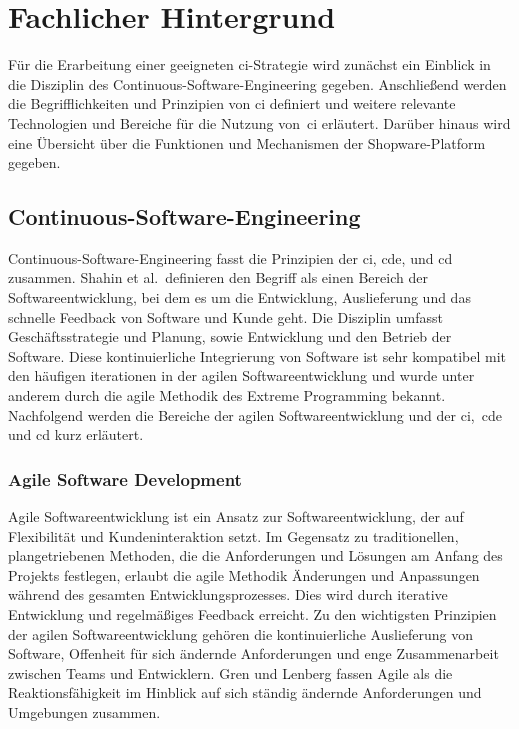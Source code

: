 
\section{Fachlicher Hintergrund} \label{sec:02-background}

Für die Erarbeitung einer geeigneten \acrshort{ci}-Strategie wird zunächst ein Einblick in die Disziplin des
Continuous-Software-Engineering gegeben.
Anschließend werden die Begrifflichkeiten und Prinzipien von \acrlong{ci} definiert und weitere
relevante Technologien und Bereiche für die Nutzung von\ \acrshort{ci} erläutert.
Darüber hinaus wird eine Übersicht über die Funktionen und Mechanismen der Shopware-Platform gegeben.

\subsection{Continuous-Software-Engineering} \label{subsec:02-background-1}

Continuous-Software-Engineering fasst die Prinzipien der \acrfull{ci}, \acrfull{cde}, und \acrfull{cd} zusammen.
Shahin et al.\ definieren den Begriff als einen Bereich der Softwareentwicklung, bei dem es um die Entwicklung,
Auslieferung und das schnelle Feedback von Software und Kunde geht.
Die Disziplin umfasst Geschäftsstrategie und Planung, sowie Entwicklung und den Betrieb der Software.
Diese kontinuierliche Integrierung von Software ist sehr kompatibel mit den häufigen iterationen in der agilen
Softwareentwicklung und wurde unter anderem durch die agile Methodik des Extreme Programming bekannt.
Nachfolgend werden die Bereiche der agilen Softwareentwicklung und der \acrshort{ci},\ \acrshort{cde} und \acrshort{cd}
kurz erläutert.

\subsubsection{Agile Software Development}

Agile Softwareentwicklung ist ein Ansatz zur Softwareentwicklung, der auf Flexibilität und Kundeninteraktion setzt.
Im Gegensatz zu traditionellen, plangetriebenen Methoden, die die Anforderungen und Lösungen am Anfang des Projekts
festlegen, erlaubt die agile Methodik Änderungen und Anpassungen während des gesamten Entwicklungsprozesses.
Dies wird durch iterative Entwicklung und regelmäßiges Feedback erreicht.
Zu den wichtigsten Prinzipien der agilen Softwareentwicklung gehören die kontinuierliche Auslieferung von Software,
Offenheit für sich ändernde Anforderungen und enge Zusammenarbeit zwischen Teams und Entwicklern.
Gren und Lenberg fassen Agile als die Reaktionsfähigkeit im Hinblick auf sich ständig ändernde Anforderungen
und Umgebungen zusammen.

